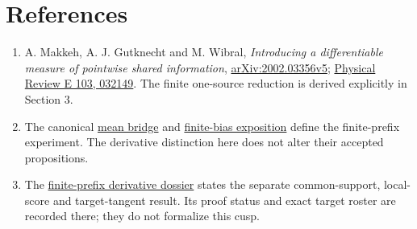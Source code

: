 \documentclass[11pt,a4paper]{article}
\providecommand{\tightlist}{\setlength{\itemsep}{0pt}\setlength{\parskip}{0pt}}
\begin{document}
\section{References}\label{references}

\begin{enumerate}
\def\labelenumi{\arabic{enumi}.}
\tightlist
\item
  A. Makkeh, A. J. Gutknecht and M. Wibral, \emph{Introducing a differentiable measure of pointwise shared information}, \href{https://arxiv.org/abs/2002.03356v5}{arXiv:2002.03356v5}; \href{https://doi.org/10.1103/PhysRevE.103.032149}{Physical Review E 103, 032149}. The finite one-source reduction is derived explicitly in Section 3.
\item
  The canonical \href{https://github.com/sepahead/pid-rs/blob/main/audit/formal/lean-prefix-mgw-mean/EXPOSITION.current.md}{mean bridge} and \href{https://github.com/sepahead/pid-rs/blob/main/audit/formal/lean-prefix-mgw-bias/EXPOSITION.md}{finite-bias exposition} define the finite-prefix experiment. The derivative distinction here does not alter their accepted propositions.
\item
  The \href{https://github.com/sepahead/pid-rs/blob/main/audit/research/finite-prefix-mgw-gradient/EXPOSITION.md}{finite-prefix derivative dossier} states the separate common-support, local-score and target-tangent result. Its proof status and exact target roster are recorded there; they do not formalize this cusp.
\end{enumerate}
\end{document}
